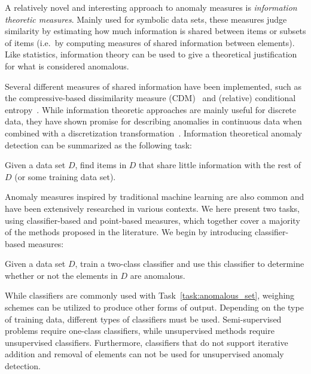A relatively novel and interesting approach to anomaly measures is \emph{information theoretic measures}. Mainly used for symbolic data sets, these measures judge similarity by estimating how much information is shared between items or subsets of items (i.e.\ by computing measures of shared information between elements). Like statistics, information theory can be used to give a theoretical justification for what is considered anomalous.

Several different measures of shared information have been implemented, such as the compressive-based dissimilarity measure (CDM)~\cite{keogh2} and (relative) conditional entropy~\cite{xiang}. While information theoretic approaches are mainly useful for discrete data, they have shown promise for describing anomalies in continuous data when combined with a discretization transformation~\cite{keogh2}. Information theoretical anomaly detection can be summarized as the following task:

\begin{task}
  Given a data set $D$, find items in $D$ that share little information with the rest of $D$ (or some training data set).
\end{task}

Anomaly measures inspired by traditional machine learning are also common and have been extensively researched in various contexts. We here present two tasks, using classifier-based and point-based measures, which together cover a majority of the methods proposed in the literature. We begin by introducing classifier-based measures:

\begin{task}
  Given a data set $D$, train a two-class classifier and use this classifier to determine whether or not the elements in $D$ are anomalous.
\end{task}

While classifiers are commonly used with Task~\ref{task:anomalous_set}, weighing schemes can be utilized to produce other forms of output. Depending on the type of training data, different types of classifiers must be used. Semi-supervised problems require one-class classifiers, while unsupervised methods require unsupervised classifiers. Furthermore, classifiers that do not support iterative addition and removal of elements can not be used for unsupervised anomaly detection.

